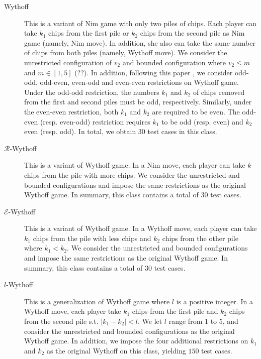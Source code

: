 \documentclass[review]{elsarticle}
\begin{document}
\begin{description}
	\item[Wythoff]
	This is a variant of Nim game with only two piles of chips. 
	Each player can take $k_1$ chips from the first pile or $k_2$ chips from the second pile as Nim game (namely, Nim move).
	In addition, she also can take the same number of chips from both piles (namely, Wythoff move).
	We consider the unrestricted configuration of $v_2$ and bounded configuration where $v_2 \leq m$ and $m \in [1, 5]$ (??).
	In addition, following this paper \cite{LiuZ2015}, we consider odd-odd, odd-even, even-odd and even-even restrictions on Wythoff game.
	Under the odd-odd restriction, the numbers $k_1$ and $k_2$ of chips removed from the first and second piles must be odd, respectively.
	Similarly, under the even-even restriction, both $k_1$ and $k_2$ are required to be even.
	The odd-even (resp. even-odd) restriction requires $k_1$ to be odd (resp. even) and $k_2$ even (resp. odd).
	In total, we obtain $30$ test cases in this class.
	
	\item[$\mathcal{R}$-Wythoff]
	This is a variant of Wythoff game.
	In a Nim move, each player can take $k$ chips from the pile with more chips.
	We consider the unrestricted and bounded configurations and impose the same restrictions as the original Wythoff game.
	In summary, this class contains a total of $30$ test cases.
	
	\item[$\mathcal{E}$-Wythoff]
	This is a variant of Wythoff game.
	In a Wythoff move, each player can take $k_1$ chips from the pile with less chips and $k_2$ chips from the other pile where $k_1 < k_2$.
	We consider the unrestricted and bounded configurations and impose the same restrictions as the original Wythoff game.
	In summary, this class contains a total of $30$ test cases.
	
	\item[$l$-Wythoff]
	This is a generalization of Wythoff game where $l$ is a positive integer.
	In a Wythoff move, each player take $k_1$ chips from the first pile and $k_2$ chips from the second pile s.t. $|k_1 - k_2| < l$.
	We let $l$ range from $1$ to $5$, and consider the unrestricted and bounded configurations as the original Wythoff game.
	In addition, we impose the four additional restrictions on $k_1$ and $k_2$ as the original Wythoff on this class, yielding $150$ test cases.
	
	

\end{description}
\end{document}
